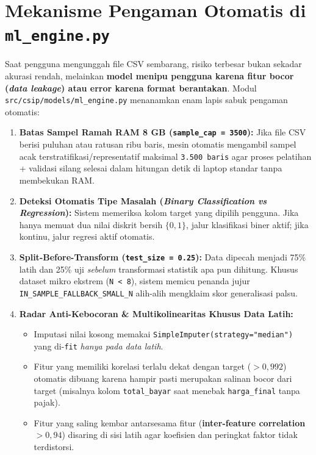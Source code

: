 \documentclass[11pt,a4paper,oneside]{book}
\newcommand{\code}[1]{{\small\nolinkurl{#1}}}
\begin{document}
\section{Mekanisme Pengaman Otomatis di \texttt{ml\_engine.py}}

Saat pengguna mengunggah file CSV sembarang, risiko terbesar bukan sekadar akurasi rendah, melainkan \textbf{model menipu pengguna karena fitur bocor (\emph{data leakage}) atau error karena format berantakan}. Modul \code{src/csip/models/ml_engine.py} menanamkan enam lapis sabuk pengaman otomatis:

\begin{teknisbox}
\begin{enumerate}
  \item \textbf{Batas Sampel Ramah RAM 8 GB (\code{sample_cap = 3500}):} Jika file CSV berisi puluhan atau ratusan ribu baris, mesin otomatis mengambil sampel acak terstratifikasi/representatif maksimal \code{3.500 baris} agar proses pelatihan + validasi silang selesai dalam hitungan detik di laptop standar tanpa membekukan RAM.
  \item \textbf{Deteksi Otomatis Tipe Masalah (\emph{Binary Classification vs Regression}):} Sistem memeriksa kolom target yang dipilih pengguna. Jika hanya memuat dua nilai diskrit bersih $\{0, 1\}$, jalur klasifikasi biner aktif; jika kontinu, jalur regresi aktif otomatis.
  \item \textbf{Split-Before-Transform (\code{test_size = 0.25}):} Data dipecah menjadi 75\% latih dan 25\% uji \emph{sebelum} transformasi statistik apa pun dihitung. Khusus dataset mikro ekstrem (\code{N < 8}), sistem memicu penanda jujur \code{IN_SAMPLE_FALLBACK_SMALL_N} alih-alih mengklaim skor generalisasi palsu.
  \item \textbf{Radar Anti-Kebocoran \& Multikolinearitas Khusus Data Latih:}
    \begin{itemize}
      \item Imputasi nilai kosong memakai \code{SimpleImputer(strategy="median")} yang di-\code{fit} \emph{hanya pada data latih}.
      \item Fitur yang memiliki korelasi terlalu dekat dengan target (\textbf{$> 0{,}992$}) otomatis dibuang karena hampir pasti merupakan salinan bocor dari target (misalnya kolom \code{total_bayar} saat menebak \code{harga_final} tanpa pajak).
      \item Fitur yang saling kembar antarsesama fitur (\textbf{inter-feature correlation $> 0{,}94$}) disaring di sisi latih agar koefisien dan peringkat faktor tidak terdistorsi.

\end{itemize}
\end{enumerate}
\end{teknisbox}
\end{document}
